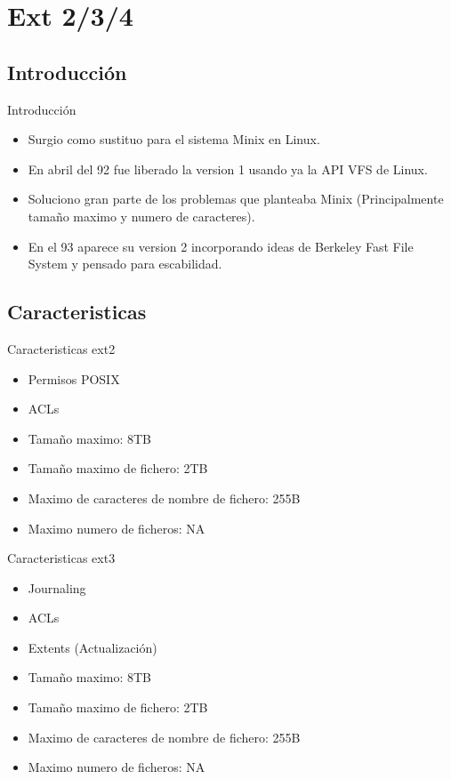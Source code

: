 \section{Ext 2/3/4}
\subsection{Introducción}
\begin{frame}{Introducción}
  \begin{itemize}
    \item Surgio como sustituo para el sistema Minix en Linux.
    \item En abril del 92 fue liberado la version 1 usando ya la API VFS de Linux.
    \item Soluciono gran parte de los problemas que planteaba Minix (Principalmente tamaño maximo y numero de caracteres).
    \item En el 93 aparece su version 2 incorporando ideas de Berkeley Fast File System y pensado para escabilidad.
  \end{itemize}
\end{frame}

\subsection{Caracteristicas}
\begin{frame}{Caracteristicas ext2}
  \begin{itemize}
    \item Permisos POSIX
    \item ACLs
    \item Tamaño maximo: 8TB
    \item Tamaño maximo de fichero: 2TB
    \item Maximo de caracteres de nombre de fichero: 255B
    \item Maximo numero de ficheros: NA
  \end{itemize}
\end{frame}

\begin{frame}{Caracteristicas ext3}
  \begin{itemize}
    \item Journaling
    \item ACLs
    \item Extents (Actualización)
    \item Tamaño maximo: 8TB
    \item Tamaño maximo de fichero: 2TB
    \item Maximo de caracteres de nombre de fichero: 255B
    \item Maximo numero de ficheros: NA
  \end{itemize}
\end{frame}

